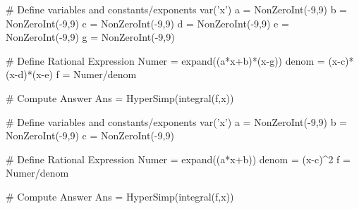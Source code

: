

\begin{sagesilent}
# Define variables and constants/exponents
var('x')
a = NonZeroInt(-9,9)
b = NonZeroInt(-9,9)
c = NonZeroInt(-9,9)
d = NonZeroInt(-9,9)
e = NonZeroInt(-9,9)
g = NonZeroInt(-9,9)


# Define Rational Expression
Numer = expand((a*x+b)*(x-g))
denom = (x-c)*(x-d)*(x-e)
f = Numer/denom

# Compute Answer
Ans = HyperSimp(integral(f,x))
\end{sagesilent}



\begin{sagesilent}
# Define variables and constants/exponents
var('x')
a = NonZeroInt(-9,9)
b = NonZeroInt(-9,9)
c = NonZeroInt(-9,9)

# Define Rational Expression
Numer = expand((a*x+b))
denom = (x-c)^2
f = Numer/denom

# Compute Answer
Ans = HyperSimp(integral(f,x))
\end{sagesilent}



